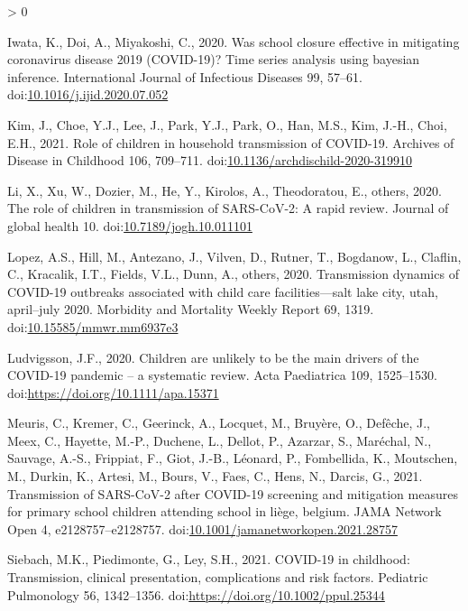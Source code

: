 \documentclass[]{elsarticle} %
\newlength{\cslhangindent}
\newenvironment{CSLReferences}[2] %
 {%
  \setlength{\parindent}{0pt}
  \ifodd #1 \everypar{\setlength{\hangindent}{\cslhangindent}}\ignorespaces\fi
  \ifnum #2 > 0
  \setlength{\parskip}{#2\baselineskip}
  \fi
 }%
 {}
\begin{document}
\begin{CSLReferences}{1}{0}
\leavevmode\hypertarget{ref-iwata2020school}{}%
Iwata, K., Doi, A., Miyakoshi, C., 2020. Was school closure effective in
mitigating coronavirus disease 2019 (COVID-19)? Time series analysis
using bayesian inference. International Journal of Infectious Diseases
99, 57--61.
doi:\href{https://doi.org/10.1016/j.ijid.2020.07.052}{10.1016/j.ijid.2020.07.052}

\leavevmode\hypertarget{ref-kim2021role}{}%
Kim, J., Choe, Y.J., Lee, J., Park, Y.J., Park, O., Han, M.S., Kim,
J.-H., Choi, E.H., 2021. Role of children in household transmission of
COVID-19. Archives of Disease in Childhood 106, 709--711.
doi:\href{https://doi.org/10.1136/archdischild-2020-319910}{10.1136/archdischild-2020-319910}

\leavevmode\hypertarget{ref-li2020role}{}%
Li, X., Xu, W., Dozier, M., He, Y., Kirolos, A., Theodoratou, E.,
others, 2020. The role of children in transmission of SARS-CoV-2: A
rapid review. Journal of global health 10.
doi:\href{https://doi.org/10.7189/jogh.10.011101}{10.7189/jogh.10.011101}

\leavevmode\hypertarget{ref-lopez2020transmission}{}%
Lopez, A.S., Hill, M., Antezano, J., Vilven, D., Rutner, T., Bogdanow,
L., Claflin, C., Kracalik, I.T., Fields, V.L., Dunn, A., others, 2020.
Transmission dynamics of COVID-19 outbreaks associated with child care
facilities---salt lake city, utah, april--july 2020. Morbidity and
Mortality Weekly Report 69, 1319.
doi:\href{https://doi.org/10.15585/mmwr.mm6937e3}{10.15585/mmwr.mm6937e3}

\leavevmode\hypertarget{ref-ludvigsson2020children}{}%
Ludvigsson, J.F., 2020. Children are unlikely to be the main drivers of
the COVID-19 pandemic -- a systematic review. Acta Paediatrica 109,
1525--1530. doi:\url{https://doi.org/10.1111/apa.15371}

\leavevmode\hypertarget{ref-meuris2021transmission}{}%
Meuris, C., Kremer, C., Geerinck, A., Locquet, M., Bruyère, O., Defêche,
J., Meex, C., Hayette, M.-P., Duchene, L., Dellot, P., Azarzar, S.,
Maréchal, N., Sauvage, A.-S., Frippiat, F., Giot, J.-B., Léonard, P.,
Fombellida, K., Moutschen, M., Durkin, K., Artesi, M., Bours, V., Faes,
C., Hens, N., Darcis, G., 2021. Transmission of SARS-CoV-2 after
COVID-19 screening and mitigation measures for primary school children
attending school in liège, belgium. JAMA Network Open 4,
e2128757--e2128757.
doi:\href{https://doi.org/10.1001/jamanetworkopen.2021.28757}{10.1001/jamanetworkopen.2021.28757}

\leavevmode\hypertarget{ref-siebach2021childhood}{}%
Siebach, M.K., Piedimonte, G., Ley, S.H., 2021. COVID-19 in childhood:
Transmission, clinical presentation, complications and risk factors.
Pediatric Pulmonology 56, 1342--1356.
doi:\url{https://doi.org/10.1002/ppul.25344}


\end{CSLReferences}
\end{document}
